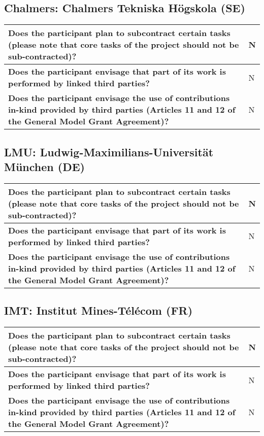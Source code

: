 \subsection*{Chalmers: Chalmers Tekniska Högskola (SE)}

\begin{longtable}{|p{}|p{}|}
\hline
{\bf Does the participant plan to subcontract certain tasks (please
  note that core tasks of the project should not be sub-contracted)?}
&
N
\\
\hline
{\bf Does the participant envisage that  part of its work is performed
  by linked third parties?}
&
N
\\
\hline
{\bf Does the participant envisage the use of contributions in-kind
provided by third parties (Articles 11 and 12 of the General Model
Grant Agreement)?}
&
N
\\
\hline
\end{longtable}

\subsection*{LMU: Ludwig-Maximilians-Universität München (DE)}

\begin{longtable}{|p{}|p{}|}
\hline
{\bf Does the participant plan to subcontract certain tasks (please
  note that core tasks of the project should not be sub-contracted)?}
&
N
\\
\hline
{\bf Does the participant envisage that  part of its work is performed
  by linked third parties?}
&
N
\\
\hline
{\bf Does the participant envisage the use of contributions in-kind
provided by third parties (Articles 11 and 12 of the General Model
Grant Agreement)?}
&
N
\\
\hline
\end{longtable}

\subsection*{IMT: Institut Mines-Télécom (FR)}

\begin{longtable}{|p{}|p{}|}
\hline
{\bf Does the participant plan to subcontract certain tasks (please
  note that core tasks of the project should not be sub-contracted)?}
&
N
\\
\hline
{\bf Does the participant envisage that  part of its work is performed
  by linked third parties?}
&
N
\\
\hline
{\bf Does the participant envisage the use of contributions in-kind
provided by third parties (Articles 11 and 12 of the General Model
Grant Agreement)?}
&
N
\\
\hline
\end{longtable}

